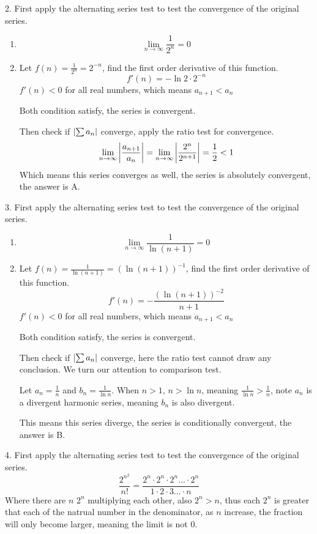 \documentclass{article}
\numberwithin{equation}{section}
\begin{document}
2. First apply the alternating series test to test the convergence of the original series.
\begin{enumerate}
    \item 
    \[
    \lim_{n\to\infty} \frac{1}{2^n} = 0
    \]
    \item Let $\displaystyle f(n) = \frac{1}{2^n} = 2^{-n}$, find the first order derivative of this function.
    \[
    f'(n) = -\ln 2 \cdot 2^{-n}
    \]
    $f'(n) < 0$ for all real numbers, which means $a_{n+1} < a_n$

    Both condition satisfy, the series is convergent.

    Then check if $\abs{\sum a_n}$ converge, apply the ratio test for convergence.
    \[
    \lim_{n\to\infty} \abs{\frac{a_{n+1}}{a_n}} = \lim_{n\to\infty} \abs{\frac{2^n}{2^{n+1}}} = \frac{1}{2} < 1
    \]
    Which means this series converges as well, the series is absolutely convergent, the answer is A.
\end{enumerate}

3. First apply the alternating series test to test the convergence of the original series.
\begin{enumerate}
    \item 
    \[
    \lim_{n\to\infty} \frac{1}{\ln(n+1)} = 0
    \]
    \item Let $\displaystyle f(n) = \frac{1}{\ln(n+1)} = \left(\ln(n+1)\right)^{-1}$, find the first order derivative of this function.
    \[
    f'(n) = -\frac{\left(\ln(n+1)\right)^{-2}}{n+1}
    \]
    $f'(n) < 0$ for all real numbers, which means $a_{n+1} < a_n$

    Both condition satisfy, the series is convergent.

    Then check if $\abs{\sum a_n}$ converge, here the ratio test cannot draw any conclusion. We turn our attention to comparison test.
    
    Let $\displaystyle a_n = \frac{1}{n}$ and $\displaystyle b_n = \frac{1}{\ln n}$. When $n > 1$, $n > \ln n$, meaning $\displaystyle \frac{1}{\ln n} > \frac{1}{n}$, note $a_n$ is a divergent harmonic series, meaning $b_n$ is also divergent.

    This means this series diverge, the series is conditionally convergent, the answer is B.
\end{enumerate}

4. First apply the alternating series test to test the convergence of the original series.
    \[
    \frac{2^{n^2}}{n!} = \frac{2^n\cdot 2^n \cdot 2^n ... \cdot 2^n}{1\cdot 2 \cdot 3 ... \cdot n}
    \]
Where there are $n$ $2^n$ multiplying each other, also $2^n > n$, thus each $2^n$ is greater that each of the natrual number in the denominator, as $n$ increase, the fraction will only become larger, meaning the limit is not $0$.
\end{document}
